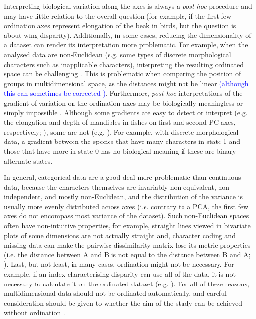 \documentclass[12pt,letterpaper]{article}
\begin{document}
Interpreting biological variation along the axes is always a \textit{post-hoc} procedure and may have little relation to the overall question (for example, if the first few ordination axes represent elongation of the beak in birds, but the question is about wing disparity).
Additionally, in some cases, reducing the dimensionality of a dataset can render its interpretation more problematic.
For example, when the analysed data are non-Euclidean (e.g. some types of discrete morphological characters such as inapplicable characters), interpreting the resulting ordinated space can be challenging \citep{Gerber2019}.
This is problematic when comparing the position of groups in multidimensional space, as the distances might not be linear \textcolor{blue}{(although this can sometimes be corrected \citealt{cailliez1983})}.
Furthermore, \textit{post-hoc} interpretations of the gradient of variation on the ordination axes may be biologically meaningless or simply impossible \citep{Gerber2019}.
Although some gradients are easy to detect or interpret (e.g.
the elongation and depth of mandibles in fishes on first and second PC axes, respectively; \citealt{Hill2018}), some are not (e.g. \citealt{Weisbecker2019}).
For example, with discrete morphological data, a gradient between the species that have many characters in state 1 and those that have more in state 0 has no biological meaning if these are binary alternate states.

In general, categorical data are a good deal more problematic than continuous data, because the characters themselves are invariably non-equivalent, non-independent, and mostly non-Euclidean, and the distribution of the variance is usually more evenly distributed across axes (i.e. contrary to a PCA, the first few axes do not encompass most variance of the dataset).
Such non-Euclidean spaces often have non-intuitive properties, for example, straight lines viewed in bivariate plots of some dimensions are not actually straight and, character coding and missing data can make the pairwise dissimilarity matrix lose its metric properties (i.e. the distance between A and B is not equal to the distance between B and A; \citealt{Gerber2014}).
Last, but not least, in many cases, ordination might not be necessary.
For example, if an index characterising disparity can use all of the data, it is not necessary to calculate it on the ordinated dataset (e.g. \citealt{Close2015}).
For all of these reasons, multidimensional data should not be ordinated automatically, and careful consideration should be given to whether the aim of the study can be achieved without ordination \citep{lloyd2016,lloyd2018}.
\end{document}
